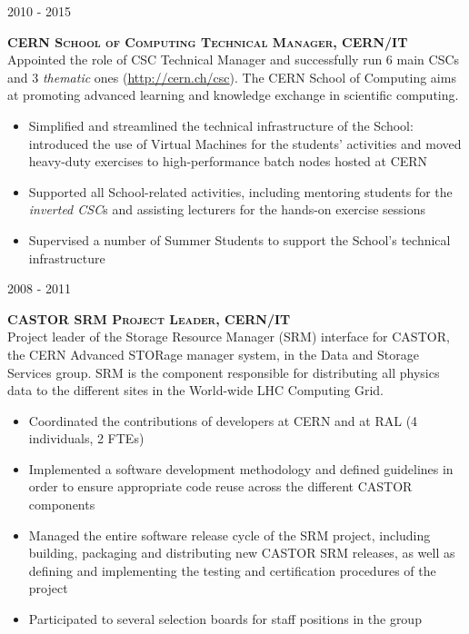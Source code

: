 \documentclass[11pt]{article}
\renewcommand{\subsection}[2]%
        {
         {\bf{\raggedright \scshape #1}}{\bf{\hfill \scshape #2}}\\[-.7\baselineskip]
}
\newenvironment{CompactItemize} {
  \begin{itemize}
  \setlength{\itemsep}{-3pt}
  \setlength{\parsep}{0pt}
  \setlength{\topsep}{-2pt}
  \setlength{\partopsep}{-2pt}
} {\end{itemize}}
\begin{document}
\subsection{2010 - 2015}{CERN School of Computing Technical Manager, CERN/IT}

Appointed the role of CSC Technical Manager and successfully run 6 main CSCs and 3 \emph{thematic} ones
(\href{http://cern.ch/csc}{http://cern.ch/csc}). The CERN School of Computing aims at promoting
advanced learning and knowledge exchange in scientific computing.

\begin{CompactItemize}
\item Simplified and streamlined the technical infrastructure of the School: introduced
      the use of Virtual Machines for the students' activities and moved heavy-duty exercises to
      high-performance batch nodes hosted at CERN
\item Supported all School-related activities, including mentoring students for the \emph{inverted CSC}s
      and assisting lecturers for the hands-on exercise sessions
\item Supervised a number of Summer Students to support the School's technical infrastructure
\end{CompactItemize}

\subsection{2008 - 2011}{CASTOR SRM Project Leader, CERN/IT}

Project leader of the Storage Resource Manager (SRM) interface for CASTOR, the CERN Advanced STORage
manager system, in the Data and Storage Services group.
SRM is the component responsible for distributing all physics data to the different sites
in the World-wide LHC Computing Grid.

\begin{CompactItemize}
\item Coordinated the contributions of developers at CERN and at RAL (4 individuals, 2 FTEs)
\item Implemented a software development methodology and defined guidelines in order to ensure
  appropriate code reuse across the different CASTOR components
\item Managed the entire software release cycle of the SRM project, including building, packaging and distributing
  new CASTOR SRM releases, as well as defining and implementing the testing and certification procedures
  of the project
\item Participated to several selection boards for staff positions in the group
\end{CompactItemize}
\end{document}
